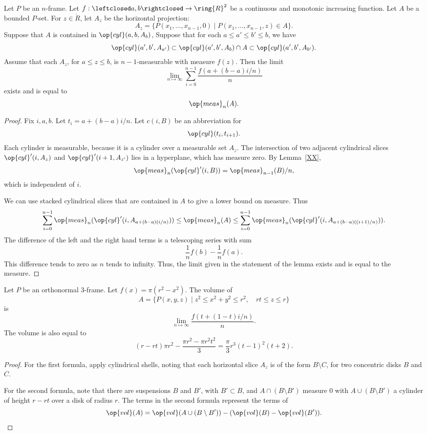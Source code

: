 \begin{lemma}  Let $P$ be an $n$-frame.
Let $f:\leftclosed a,b \rightclosed\to \ring{R}^2$ be a continuous
and monotonic increasing function.  Let $A$ be a bounded $P$-set.
For $z\in\ring{R}$, let $A_z$ be the horizontal projection:
    $$A_z = \{P(x_1,\ldots,x_{n-1},0)\mid P(x_1,\ldots,x_{n-1},z)\in A\}.$$
Suppose that $A$ is contained in $\op{cyl}(a,b,A_{b})$,  Suppose
that for each $a\le a'\le b'\le b$, we have
    $$\op{cyl}(a',b',A_{a'})\subset \op{cyl}(a',b',A_{b})\cap A
    \subset \op{cyl}(a',b',A_{b'}).$$
Assume that each $A_z$, for $a\le z\le b$, is $n-1$-measurable with
measure $f(z)$.  Then the limit
    $$\lim_{n\mapsto\infty}
    \sum_{i=0}^{n-1}\frac{f(a+(b-a)i/n)}{n}$$
exists and is equal to
    $$\op{meas}_n(A).$$
\end{lemma}

\begin{proof}
Fix $i,a,b$.  Let $t_i = a + (b-a)i/n$.  Let $c(i,B)$ be an
abbreviation for
    $$
    \op{cyl}(t_i,t_{i+1}).
    $$
Each cylinder is measurable, because it is a cylinder over a
measurable set $A_z$. The intersection of two adjacent cylindrical
slices $\op{cyl}'(i,A_z)$ and $\op{cyl}'(i+1,A_{z'})$ lies in a
hyperplane, which has measure zero. By Lemma~\ref{XX},
    $$\op{meas}_n(\op{cyl}'(i,B)) = \op{meas}_{n-1}(B)/n,$$
which is independent of $i$.

We can use stacked cylindrical slices that are contained in $A$ to
give a lower bound on measure.  Thus
$$\sum_{i=0}^{n-1}\op{meas}_n(\op{cyl}'(i,A_{a+(b-a)(i/n)})) \le
\op{meas}_n(A)\le
\sum_{i=0}^{n-1}\op{meas}_n(\op{cyl}'(i,A_{a+(b-a)((i+1)/n)})).$$
The difference of the left and the right hand terms is a telescoping
series with sum
    $$\frac{1}{n} f(b) -
    \frac{1}{n}f(a) .$$
This difference tends to zero as $n$ tends to infinity. Thus, the
limit given in the statement of the lemma exists and is equal to the
measure.
\end{proof}

\begin{lemma} Let $P$ be an orthonormal $3$-frame.
Let $f(x) = \pi(r^2-x^2)$.  The volume of
    $$A=\{P(x,y,z) \mid z^2\le x^2 + y^2\le r^2,\quad r t\le z\le r\}$$
is $$\lim_{n\mapsto\infty} \frac{f(t + (1-t)i/n)}n.$$ The volume is
also equal to
    $$
    (r-r t)\pi r^2 - \frac{\pi r^2 - \pi r^2 t^2}3 =
    \frac{\pi}3 r^3 (t-1)^2 (t+2).
    $$
\end{lemma}

\begin{proof} For the first formula, apply cylindrical shells,
noting that each horizontal slice $A_z$ is of the form $B\setminus
C$, for two concentric disks $B$ and $C$.

For the second formula, note that there are suspensions $B$ and
$B'$, with $B'\subset B$, and $A\cap (B\setminus B')$ measure $0$
with $A\cup (B\setminus B')$ a cylinder of height $r-r t$ over a
disk of radius $r$.  The terms in the second formula represent the
terms of
    $$\op{vol}(A) = \op{vol}(A\cup (B\setminus B')) - (\op{vol}(B)-\op{vol}(B')).$$
\end{proof}


